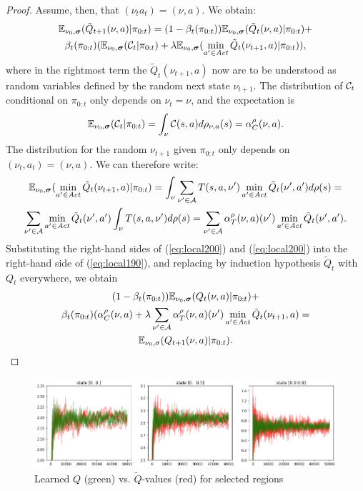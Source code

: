 \documentclass{llncs}
\begin{document}
\begin{proof}
Assume, then, that $(\nu_{t}a_{t})=(\nu,a)$. We obtain:
\begin{multline}
\label{eq:local190}
\mathbb{E}_{\nu_0,\boldsymbol{\sigma}}(\tilde{Q}_{t+1}(\nu,a)|\pi_{0:t})= 
(1-\beta_{t}(\pi_{0:t}))\mathbb{E}_{\nu_0,\boldsymbol{\sigma}}(\tilde{Q}_{t}(\nu,a)|\pi_{0:t}) +\\
\beta_{t}(\pi_{0:t})(\mathbb{E}_{\nu_0,\boldsymbol{\sigma}}(\mathcal{C}_{t}|\pi_{0:t})+
\lambda \mathbb{E}_{\nu_0,\boldsymbol{\sigma}}(\min_{a'\in\mathit{Act}}\tilde{Q}_{t}(\nu_{t+1},a)|\pi_{0:t}) ),
\end{multline}
where in the rightmost term the $\tilde{Q}_{t}(\nu_{t+1},a)$ now are to be understood as random
variables defined by the random next state $\nu_{t+1}$. 
The distribution of $\mathcal{C}_t$ conditional on $\pi_{0:t}$ only depends on $\nu_t=\nu$, and the expectation is
\begin{equation}
\label{eq:local200}
\mathbb{E}_{\nu_0,\boldsymbol{\sigma}}(\mathcal{C}_{t}|\pi_{0:t})=\int_\nu \mathcal{C}(s,a) d\rho_{\nu,a}(s)=\alpha^\rho_C(\nu,a).
\end{equation}
The distribution for the random $\nu_{t+1}$ given $\pi_{0:t}$
only depends on $(\nu_t,a_t)=(\nu,a)$. We can therefore write: 
\begin{multline}
\label{eq:local210}
\mathbb{E}_{\nu_0,\boldsymbol{\sigma}}(\min_{a'\in\mathit{Act}}\tilde{Q}_{t}(\nu_{t+1},a)|\pi_{0:t}) = 
\int_\nu  \sum_{\nu'\in\mathcal{A}} T(s,a,\nu')  \min_{a'\in\mathit{Act}} \tilde{Q}_{t}(\nu',a') d\rho(s) =\\
\sum_{\nu'\in\mathcal{A}} \min_{a'\in\mathit{Act}} \tilde{Q}_{t}(\nu',a') \int_\nu  T(s,a,\nu') d\rho(s) =
\sum_{\nu'\in\mathcal{A}} \alpha^\rho_T(\nu,a)(\nu')   \min_{a'\in\mathit{Act}} \tilde{Q}_{t}(\nu',a').
\end{multline}
Substituting the right-hand sides of (\ref{eq:local200}) and (\ref{eq:local200}) into the
right-hand side of (\ref{eq:local190}), and replacing by induction hypothesis
$\tilde{Q}_t$ with $Q_t$ everywhere, we obtain
\begin{multline}
(1-\beta_{t}(\pi_{0:t}))\mathbb{E}_{\nu_0,\boldsymbol{\sigma}}({Q}_{t}(\nu,a)|\pi_{0:t}) +\\
\beta_{t}(\pi_{0:t})(\alpha^\rho_C(\nu,a)  +
\lambda \sum_{\nu'\in\mathcal{A}} \alpha^\rho_T(\nu,a)(\nu') \min_{a'\in\mathit{Act}}\tilde{Q}_{t}(\nu_{t+1},a) =\\
\mathbb{E}_{\nu_0,\sigma}({Q}_{t+1}(\nu,a)|\pi_{0:t}).
\end{multline}

\end{proof}

\begin{figure}[t]
\centering
\includegraphics[width=\textwidth]{./Figures/traces-g5.png}
\caption{Learned $Q$  (green) vs. $\tilde{Q}$-values (red) for selected regions \label{fig:Qcurves}}
\end{figure}
\end{document}

